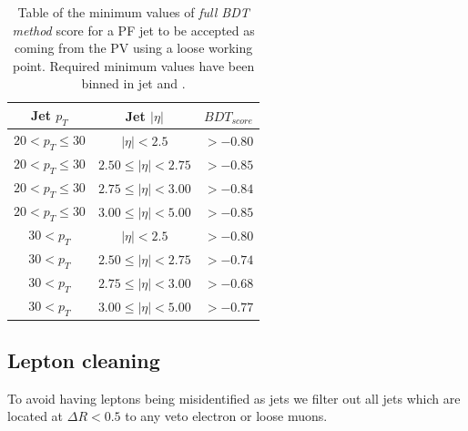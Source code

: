 \begin{table}[!htb]
\centering
\begin{tabular}{|c|c|c|}
\hline
Jet $p_{T}$          & Jet $|\eta|$              & $BDT_{score}$ \\
\hline \hline
$20 < p_{T} \leq 30$ & $|\eta| < 2.5$            & $> -0.80$ \\
$20 < p_{T} \leq 30$ & $2.50 \leq |\eta| < 2.75$ & $> -0.85$ \\
$20 < p_{T} \leq 30$ & $2.75 \leq |\eta| < 3.00$ & $> -0.84$ \\
$20 < p_{T} \leq 30$ & $3.00 \leq |\eta| < 5.00$ & $> -0.85$ \\
$30 < p_{T}$         & $|\eta| < 2.5$            & $> -0.80$ \\
$30 < p_{T}$         & $2.50 \leq |\eta| < 2.75$ & $> -0.74$ \\
$30 < p_{T}$         & $2.75 \leq |\eta| < 3.00$ & $> -0.68$ \\
$30 < p_{T}$         & $3.00 \leq |\eta| < 5.00$ & $> -0.77$ \\
\hline
\end{tabular}
\caption[Table of the minimum values of full BDT method score for a PF jet to be accepted as coming from the PV using a loose working point.]
{Table of the minimum values of \textit{full \gls{BDT} method} score for a \gls{PF} jet to be accepted as coming from the \gls{PV} using a loose working point. Required minimum values have been binned in jet \pt and \eta.}
\label{TABLE:EventReconstructionAndSimulation_PileupJetIDFullBDTLooseWorkingPoint}
\end{table}

\subsection{Lepton cleaning}
\label{SECTION:EventReconstructionAndSimulation_Jets_LeptonCleaning}


To avoid having leptons being misidentified as jets we filter out all jets which are located at $\Delta R < 0.5$ to any veto electron or loose muons.

